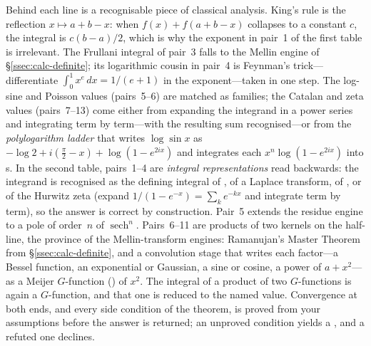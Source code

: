 Behind each line is a recognisable piece of classical analysis. King's
rule is the reflection \(x\mapsto a+b-x\): when
\(f(x)+f(a+b-x)\) collapses to a constant \(c\), the integral is \(c(b-a)/2\), which
is why the exponent in pair~1 of the first table is irrelevant. The Frullani
integral of pair~3 falls to the Mellin engine of \S\ref{ssec:calc-definite}; its
logarithmic cousin in pair~4 is Feynman's trick---differentiate
\(\int_0^1 x^e\,dx = 1/(e+1)\) in the exponent---taken in one step. The log-sine and Poisson values (pairs~5--6) are matched as families; the
Catalan and zeta values (pairs~7--13) come either from expanding the integrand in a
power series and integrating term by term---with the resulting sum recognised---or from
the \emph{polylogarithm ladder} that writes
\(\log\sin x\) as \(-\log 2 + i(\tfrac\pi2-x) + \log(1-e^{2ix})\) and integrates each
\(x^n\log(1-e^{2ix})\) into s. In the second table, pairs~1--4 are
\emph{integral representations} read backwards: the
integrand is recognised as the defining integral of , of a Laplace
transform, of , or of the Hurwitz zeta (expand
\(1/(1-e^{-x})=\sum_k e^{-kx}\) and integrate term by term), so the answer is
correct by construction. Pair~5 extends the residue engine to a pole of order~\(n\)
of \(\operatorname{sech}^n\). Pairs~6--11 are products of two kernels on the half-line,
the province of the Mellin-transform engines: Ramanujan's Master Theorem from
\S\ref{ssec:calc-definite}, and a convolution stage that writes each factor---a Bessel
function, an exponential or Gaussian, a sine or cosine, a power of \(a+x^2\)---as a
Meijer \(G\)-function () of \(x^2\). The integral of a product of two \(G\)-functions is
again a \(G\)-function, and that one is reduced to the named value. Convergence at
both ends, and every side condition of the theorem, is proved from your assumptions
before the answer is returned; an unproved condition yields a
, and a refuted one declines.



